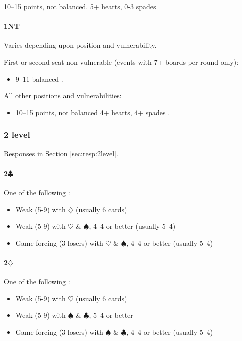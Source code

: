 \documentclass[a4paper,14pt]{extarticle}
\begin{document}
10--15 points, not balanced. 5+ hearts, 0-3 spades 

\paragraph{1NT}

Varies depending upon position and vulnerability.

First or second seat non-vulnerable (events with 7+ boards per round only):
\begin{itemize}
\item 9--11 balanced .
\end{itemize}

All other positions and vulnerabilities:
\begin{itemize}
\item 10--15 points, not balanced 4+ hearts, 4+ spades .
\end{itemize}

\newpage 

\subsubsection{2 level}
\label{sec:open:2level}

Responses in Section \ref{sec:resp:2level}.

\paragraph{2$\clubsuit$}
One of the following :
\begin{itemize}
\item Weak (5-9) with $\diamondsuit$ (usually 6 cards)
\item Weak (5-9) with $\heartsuit$ \& $\spadesuit$, 4--4 or better (usually 5--4)
\item Game forcing (3 losers) with $\heartsuit$ \& $\spadesuit$, 4--4 or better (usually 5--4)
\end{itemize}

\paragraph{2$\diamondsuit$}
One of the following :
\begin{itemize}
\item Weak (5-9) with $\heartsuit$ (usually 6 cards)
\item Weak (5-9) with $\spadesuit$ \& $\clubsuit$, 5--4 or better 
\item Game forcing (3 losers) with $\spadesuit$ \& $\clubsuit$, 4--4 or better  (usually 5--4)
\end{itemize}
\end{document}
